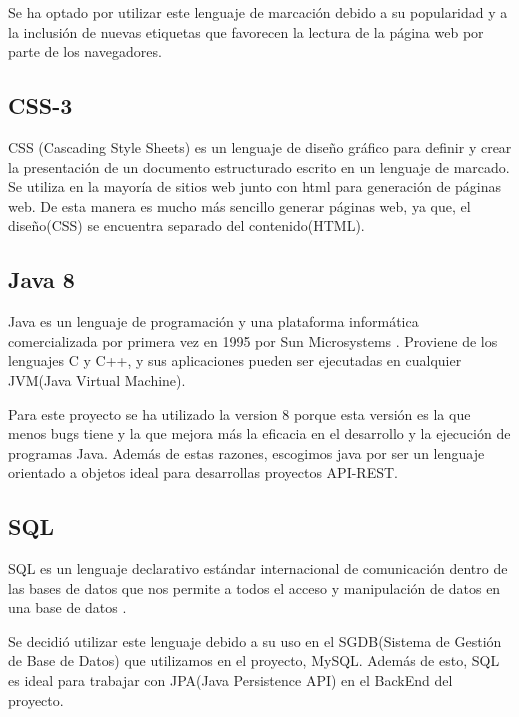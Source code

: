     Se ha optado por utilizar este lenguaje de marcación debido a su popularidad y a la inclusión de nuevas etiquetas que favorecen la lectura de la página web por parte de los navegadores.
    \newline
    
    
    \subsection{CSS-3}
    CSS (Cascading Style Sheets) es un lenguaje de diseño gráfico para definir y crear la presentación de un documento estructurado escrito en un lenguaje de marcado\cite{css}. Se utiliza en la mayoría de sitios web junto con html para generación de páginas web. De esta manera es mucho más sencillo generar páginas web, ya que, el diseño(CSS) se encuentra separado del contenido(HTML).
    \newline
    
    
    
    \subsection{Java 8}
    Java es un lenguaje de programación y una plataforma informática comercializada por primera vez en 1995 por Sun Microsystems \cite{java}. Proviene de los lenguajes C y C++, y sus aplicaciones pueden ser ejecutadas en cualquier JVM(Java Virtual Machine).
    \newline
    
    Para este proyecto se ha utilizado la version 8 porque esta versión es la que menos bugs tiene y la que mejora más la eficacia en el desarrollo y la ejecución de programas Java. \cite{java8} Además de estas razones, escogimos java por ser un lenguaje orientado a objetos ideal para desarrollas proyectos API-REST.
    
    \subsection{SQL}
    SQL es un lenguaje declarativo estándar internacional de comunicación dentro de las bases de datos que nos permite a todos el acceso y manipulación de datos en una base de datos \cite{sql}.
    \newline
    
    Se decidió utilizar este lenguaje debido a su uso en el SGDB(Sistema de Gestión de Base de Datos) que utilizamos en el proyecto, MySQL. Además de esto, SQL es ideal para trabajar con JPA(Java Persistence API) en el BackEnd del proyecto.
    
